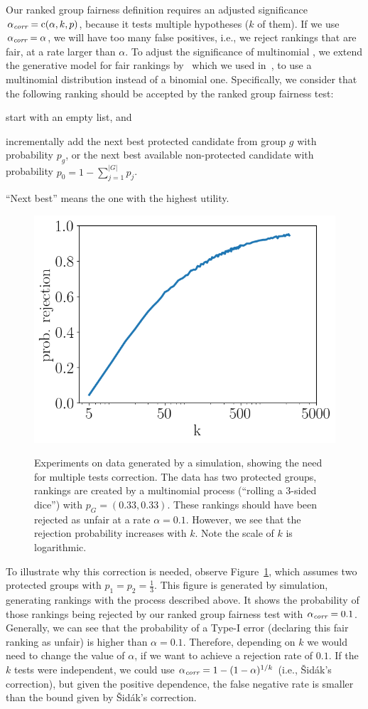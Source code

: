 Our ranked group fairness definition requires an adjusted significance $\alpha_\textit{corr} = \operatorname{c}(\alpha, k, p)$, because it tests multiple hypotheses ($k$ of them).
%
If we use $\alpha_\textit{corr} = \alpha$, we will have too many false positives, i.e., we reject rankings that are fair, at a rate larger than $\alpha$.
%
To adjust the significance of multinomial \algoFAIR, we extend the generative model for fair rankings by~\citet{yang2016measuring} which we used in~\cite{zehlike2017fair}, to use a multinomial distribution instead of a binomial one.
%
Specifically, we consider that the following ranking should be accepted by the ranked group fairness test: \begin{inparaenum}[(i)]
	\item start with an empty list, and
	\item incrementally add the next best protected candidate from group $g$ with probability $p_g$, or the next best available non-protected candidate with probability $p_0 = 1-\sum_{j=1}^{|G|} p_j$.
\end{inparaenum}
%
``Next best'' means the one with the highest utility.

\begin{figure}[h]
	\centering
	{\includegraphics[width=.48\textwidth]{pics/failProbPlotMultinom.png}}
	\caption{Experiments on data generated by a simulation, showing the need for multiple tests correction.
		The data has two protected groups, rankings are created by a multinomial process (``rolling a 3-sided dice'') with $p_G = (0.33, 0.33)$.
		These rankings should have been rejected as unfair at a rate $\alpha = 0.1$.
		However, we see that the rejection probability increases with $k$.
		Note the scale of $k$ is logarithmic.}
	\label{fig:why-adjustment-is-needed-multinomial}
\end{figure}
To illustrate why this correction is needed, observe Figure~\ref{fig:why-adjustment-is-needed-multinomial}, which assumes two protected groups with $p_1=p_2=\frac{1}{3}$.
%
This figure is generated by simulation, generating rankings with the process described above.
%
It shows the probability of those rankings being rejected by our ranked group fairness test with $\alpha_\textit{corr}=0.1$.
%
Generally, we can see that the probability of a Type-I error (declaring this fair ranking as unfair) is higher than $\alpha = 0.1$.
%
Therefore, depending on $k$ we would need to change the value of $\alpha$, if we want to achieve a rejection rate of $0.1$.
%
If the $k$ tests were independent, we could use $\alpha_\textit{corr} = 1 - (1 - \alpha)^{1/k}$ (i.e., {\v S}id{\'a}k's correction), but given the positive dependence, the false negative rate is smaller than the bound given by {\v S}id{\'a}k's correction.

